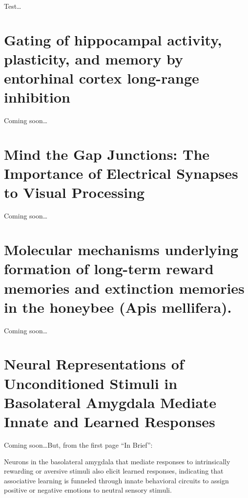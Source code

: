 \documentclass[11pt, a4paper, oneside]{article}   	%
\begin{document}
Test\ldots





\section{Gating of hippocampal activity, plasticity, and memory by entorhinal cortex long-range inhibition \cite{Basu2016}}

Coming soon\ldots

\section{Mind the Gap Junctions: The Importance of Electrical Synapses to Visual Processing \cite{Demb2016}}

Coming soon\ldots

\section{Molecular mechanisms underlying formation of long-term reward memories and extinction memories in the honeybee (Apis mellifera). \cite{Eisenhardt2014}}

Coming soon\ldots


\section{Neural Representations of Unconditioned Stimuli in Basolateral Amygdala Mediate Innate and Learned Responses \cite{Gore2015}}

Coming soon\ldots But, from the first page ``In Brief'':

Neurons in the basolateral amygdala that mediate responses to intrinsically rewarding or aversive stimuli also elicit learned responses, indicating that associative learning is funneled through innate behavioral circuits to assign positive or negative emotions to neutral sensory stimuli.
\end{document}
